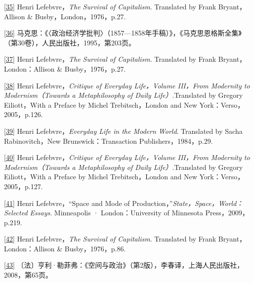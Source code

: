 \documentclass[UTF8, fontset = sourcesans, a4paper, oneside, zihao =
-4, scheme=chinese, no-math, space=true]{ctexbook}
\begin{document}
\protect\hypertarget{part0007_split_004.htmlux5cux23m35}{}{}\protect\hyperlink{part0007_split_002.htmlux5cux23w35}{{[}35{]}}
Henri Lefebvre，\emph{The Survival of Capitalism}. Translated by Frank
Bryant，Allison \& Busby，London，1976，p.27.

\protect\hypertarget{part0007_split_004.htmlux5cux23m36}{}{}\protect\hyperlink{part0007_split_002.htmlux5cux23w36}{{[}36{]}}
马克思：《〈政治经济学批判〉（1857---1858年手稿）》，《马克思恩格斯全集》（第30卷），人民出版社，1995，第203页。

\protect\hypertarget{part0007_split_004.htmlux5cux23m37}{}{}\protect\hyperlink{part0007_split_002.htmlux5cux23w37}{{[}37{]}}
Henri Lefebvre，\emph{The Survival of Capitalism}. Translated by Frank
Bryant，London：Allison \& Busby，1976，p.27.

\protect\hypertarget{part0007_split_004.htmlux5cux23m38}{}{}\protect\hyperlink{part0007_split_002.htmlux5cux23w38}{{[}38{]}}
Henri Lefebvre，\emph{Critique of Everyday Life，Volume III，From
Modernity to Modernism（Towards a Metaphilosophy of Daily
Life）}.Translated by Gregory Eiliott，With a Preface by Michel
Trebitsch，London and New York：Verso，2005，p.126.

\protect\hypertarget{part0007_split_004.htmlux5cux23m39}{}{}\protect\hyperlink{part0007_split_002.htmlux5cux23w39}{{[}39{]}}
Henri Lefebvre，\emph{Everyday Life in the Modern World}. Translated by
Sacha Rabinovitch，New Brunswick：Transaction Publishers，1984，p.29.

\protect\hypertarget{part0007_split_004.htmlux5cux23m40}{}{}\protect\hyperlink{part0007_split_002.htmlux5cux23w40}{{[}40{]}}
Henri Lefebvre，\emph{Critique of Everyday Life，Volume III，From
Modernity to Modernism（Towards a Metaphilosophy of Daily
Life）}.Translated by Gregory Eiliott，With a Preface by Michel
Trebitsch，London and New York：Verso，2005，p.127.

\protect\hypertarget{part0007_split_004.htmlux5cux23m41}{}{}\protect\hyperlink{part0007_split_002.htmlux5cux23w41}{{[}41{]}}
Henri Lefebvre，``Space and Mode of
Production，''\emph{State，Space，World：Selected Essays}. Minneapolis ·
London：University of Minnesota Press，2009，p.219.

\protect\hypertarget{part0007_split_004.htmlux5cux23m42}{}{}\protect\hyperlink{part0007_split_002.htmlux5cux23w42}{{[}42{]}}
Henri Lefebvre，\emph{The Survival of Capitalism}. Translated by Frank
Bryant，London：Allison \& Busby，1976，p.86.

\protect\hypertarget{part0007_split_004.htmlux5cux23m43}{}{}\protect\hyperlink{part0007_split_003.htmlux5cux23w43}{{[}43{]}}
〔法〕亨利·勒菲弗：《空间与政治》（第2版），李春译，上海人民出版社，2008，第65页。
\end{document}
